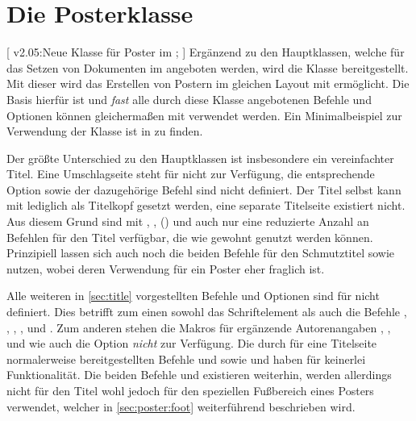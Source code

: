 \chapter[%
  Die Posterklasse \ClassRaw{tudscrposter}{\BooleanFalse}%
]{%
  Die Posterklasse%
}

\begin{DeclareEntity}{}
[
  v2.05:Neue Klasse für Poster im \TUDCD;
]
Ergänzend zu den Hauptklassen, welche für das Setzen von Dokumenten im \TUDCD 
angeboten werden, wird die Klasse  bereitgestellt. Mit 
dieser wird das Erstellen von Postern im gleichen Layout mit  
ermöglicht. Die Basis hierfür ist  und \emph{fast} alle 
durch diese Klasse angebotenen Befehle und Optionen können gleichermaßen mit 
 verwendet werden. Ein Minimalbeispiel zur Verwendung der 
Klasse ist in  zu finden.

Der größte Unterschied zu den Hauptklassen ist insbesondere ein vereinfachter 
Titel. Eine Umschlagseite steht für  nicht zur Verfügung, 
die entsprechende Option  sowie der dazugehörige Befehl 
 sind nicht definiert. Der Titel selbst kann mit 
 lediglich als Titelkopf gesetzt werden, eine separate 
Titelseite existiert nicht. Aus diesem Grund sind mit 
, , () und 
auch nur eine reduzierte Anzahl an Befehlen für den Titel verfügbar, die wie 
gewohnt genutzt werden können. Prinzipiell lassen sich auch noch die beiden 
Befehle für den Schmutztitel  sowie  
nutzen, wobei deren Verwendung für ein Poster eher fraglich ist.

Alle weiteren in \autoref{sec:title} vorgestellten Befehle und Optionen sind 
für  nicht definiert. Dies betrifft zum einen sowohl das 
Schriftelement  als auch die Befehle , 
, , ,  und  
. Zum anderen stehen die Makros für ergänzende 
Autorenangaben , , 
 und  wie auch 
die Option  \emph{nicht} zur Verfügung. Die durch 
\KOMAScript für eine Titelseite normalerweise bereitgestellten Befehle 
 und  sowie  und 
haben für  keinerlei Funktionalität. Die beiden Befehle 
 und  existieren weiterhin, werden allerdings 
nicht für den Titel wohl jedoch für den speziellen Fußbereich eines Posters 
verwendet, welcher in \autoref{sec:poster:foot} weiterführend beschrieben wird.


\end{DeclareEntity}
